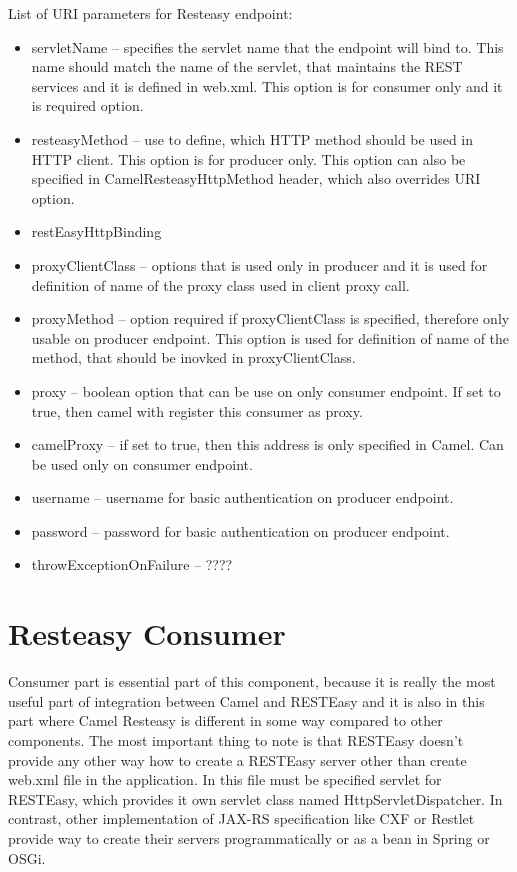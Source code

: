 \documentclass[12pt,final,oneside]{fithesis2}
\begin{document}
List of URI parameters for Resteasy endpoint:
\begin{itemize}
\item
servletName -- specifies the servlet name that the endpoint will bind to. This name should match the name of the servlet, that maintains the REST services and it is defined in web.xml. This option is for consumer only and it is required option. 

\item
resteasyMethod -- use to define, which HTTP method should be used in HTTP client. This option is for producer only. This option can also be specified in CamelResteasyHttpMethod header, which also overrides URI option.

\item
restEasyHttpBinding

\item
proxyClientClass -- options that is used only in producer and it is used for definition of name of the proxy class used in client proxy call.

\item    
proxyMethod -- option required if proxyClientClass is specified, therefore only usable on producer endpoint. This option is used for definition of name of the method, that should be inovked in proxyClientClass.

\item
proxy -- boolean option that can be use on only consumer endpoint. If set to true, then camel with register this consumer as proxy. 

\item 
camelProxy -- if set to true, then this address is only specified in Camel. Can be used only on consumer endpoint.

\item
username -- username for basic authentication on producer endpoint.

\item
password -- password for basic authentication on producer endpoint.

\item
throwExceptionOnFailure -- ????
\end{itemize}


\section{Resteasy Consumer}
Consumer part is essential part of this component, because it is really the most useful part of integration between Camel and RESTEasy and it is also in this part where Camel Resteasy is different in some way compared to other components. The most important thing to note is that RESTEasy doesn't provide any other way how to create a RESTEasy server other than create web.xml file in the application. In this file must be specified servlet for RESTEasy, which provides it own servlet class named HttpServletDispatcher. In contrast, other implementation of JAX-RS specification like CXF or Restlet provide way to create their servers programmatically or as a bean in Spring or OSGi.
\end{document}
